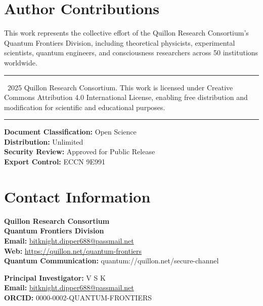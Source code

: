 \documentclass[11pt,a4paper,twoside]{article}
\begin{document}
\section*{Author Contributions}

This work represents the collective effort of the Quillon Research Consortium's Quantum Frontiers Division, including theoretical physicists, experimental scientists, quantum engineers, and consciousness researchers across 50 institutions worldwide.

\vspace{1cm}

\begin{center}
\hrule
\vspace{0.3cm}
\textcopyright\ 2025 Quillon Research Consortium. This work is licensed under Creative Commons Attribution 4.0 International License, enabling free distribution and modification for scientific and educational purposes.
\vspace{0.3cm}
\hrule
\end{center}

\vspace{0.5cm}

\begin{center}
\textbf{Document Classification:} Open Science\\
\textbf{Distribution:} Unlimited\\
\textbf{Security Review:} Approved for Public Release\\
\textbf{Export Control:} ECCN 9E991
\end{center}

\vspace{1cm}

\section*{Contact Information}

\textbf{Quillon Research Consortium}\\
\textbf{Quantum Frontiers Division}\\
\textbf{Email:} \href{mailto:bitknight.dipper688@passmail.net}{bitknight.dipper688@passmail.net}\\
\textbf{Web:} \url{https://quillon.net/quantum-frontiers}\\
\textbf{Quantum Communication:} quantum://quillon.net/secure-channel

\vspace{0.5cm}

\textbf{Principal Investigator:} V S K\\
\textbf{Email:} \href{mailto:bitknight.dipper688@passmail.net}{bitknight.dipper688@passmail.net}\\
\textbf{ORCID:} 0000-0002-QUANTUM-FRONTIERS
\end{document}

